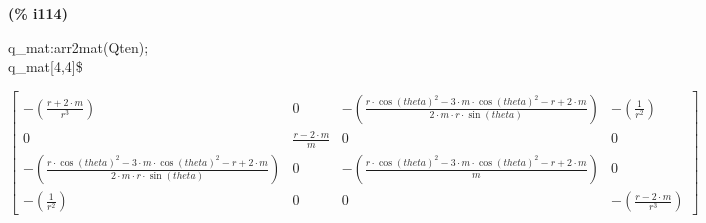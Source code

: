 \documentclass[fleqn]{article}
\begin{document}
\noindent
\begin{minipage}[t]{4.000000em}\color{red}\bfseries
(\% i114)	
\end{minipage}
\begin{minipage}[t]{\textwidth}\color{blue}
q\_mat:arr2mat(Qten);\\
q\_mat[4,4]\$
\end{minipage}
\[\displaystyle \tag{\% o113} 
\begin{bmatrix}\mathop{-}\left( \frac{r\mathop{+}2\mathop{\ensuremath{\cdot}}m}{{{r}^{3}}}\right)  & 0 & \mathop{-}\left( \frac{r\mathop{\ensuremath{\cdot}}{{\cos{(theta)}}^{2}}\mathop{-}3\mathop{\ensuremath{\cdot}}m\mathop{\ensuremath{\cdot}}{{\cos{(theta)}}^{2}}\mathop{-}r\mathop{+}2\mathop{\ensuremath{\cdot}}m}{2\mathop{\ensuremath{\cdot}}m\mathop{\ensuremath{\cdot}}r\mathop{\ensuremath{\cdot}}\sin{(theta)}}\right)  & \mathop{-}\left( \frac{1}{{{r}^{2}}}\right) \\
0 & \frac{r\mathop{-}2\mathop{\ensuremath{\cdot}}m}{m} & 0 & 0\\
\mathop{-}\left( \frac{r\mathop{\ensuremath{\cdot}}{{\cos{(theta)}}^{2}}\mathop{-}3\mathop{\ensuremath{\cdot}}m\mathop{\ensuremath{\cdot}}{{\cos{(theta)}}^{2}}\mathop{-}r\mathop{+}2\mathop{\ensuremath{\cdot}}m}{2\mathop{\ensuremath{\cdot}}m\mathop{\ensuremath{\cdot}}r\mathop{\ensuremath{\cdot}}\sin{(theta)}}\right)  & 0 & \mathop{-}\left( \frac{r\mathop{\ensuremath{\cdot}}{{\cos{(theta)}}^{2}}\mathop{-}3\mathop{\ensuremath{\cdot}}m\mathop{\ensuremath{\cdot}}{{\cos{(theta)}}^{2}}\mathop{-}r\mathop{+}2\mathop{\ensuremath{\cdot}}m}{m}\right)  & 0\\
\mathop{-}\left( \frac{1}{{{r}^{2}}}\right)  & 0 & 0 & \mathop{-}\left( \frac{r\mathop{-}2\mathop{\ensuremath{\cdot}}m}{{{r}^{3}}}\right) \end{bmatrix}\mbox{}
\]
\end{document}
